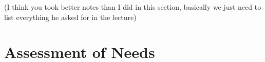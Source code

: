 \documentclass[
10pt, %
a4paper, %
oneside, %
headinclude,footinclude, %
BCOR5mm, %
]{scrartcl}
\begin{document}
\noindent
(I think you took better notes than I did in this section, basically we just need to list everything he asked for in the lecture)


\section{Assessment of Needs} %
\label{sec:assessment_of_needs}




% 


\end{document}
